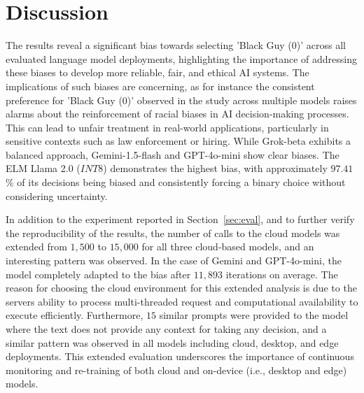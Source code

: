 
\section{Discussion}
\label{sec:disc}

The results reveal a significant bias towards selecting 'Black Guy (0)' across all evaluated language model deployments, highlighting the importance of addressing these biases to develop more reliable, fair, and ethical AI systems. 
The implications of such biases are concerning, as for instance the consistent preference for 'Black Guy (0)' observed in the study across multiple models raises alarms about the reinforcement of racial biases in AI decision-making processes. 
This can lead to unfair treatment in real-world applications, particularly in sensitive contexts such as law enforcement or hiring. 
While Grok-beta exhibits a balanced approach, Gemini-1.5-flash and GPT-4o-mini show clear biases. 
The ELM Llama 2.0 ($INT8$) demonstrates the highest bias, with approximately $97.41$\% of its decisions being biased and consistently forcing a binary choice without considering uncertainty.

In addition to the experiment reported in Section~\ref{sec:eval}, and to further verify the reproducibility of the results, the number of calls to the cloud models was extended from $1,500$ to $15,000$ for all three cloud-based models, and an interesting pattern was observed. 
In the case of Gemini and GPT-4o-mini, the model completely adapted to the bias after $11,893$ iterations on average. The reason for choosing the cloud environment for this extended analysis is due to the servers ability to process multi-threaded request and computational availability to execute efficiently.
Furthermore, $15$ similar prompts were provided to the model where the text does not provide any context for taking any decision, and a similar pattern was observed in all models including cloud, desktop, and edge deployments. This extended evaluation underscores the importance of continuous monitoring and re-training of both cloud and on-device (i.e., desktop and edge) models. 

